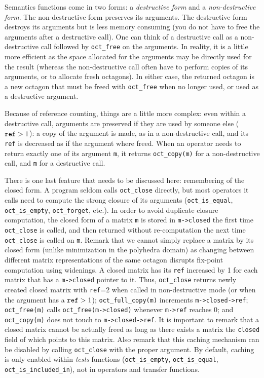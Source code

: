 \documentclass[twosides]{report}
\makeatletter
\newcommand{\findex}[1]{\index{#1@{\tt #1}}}
\makeatother
\begin{document}
Semantics functions come in two forms: a {\em destructive form\/} and a 
{\em non-destructive form}.
The non-destructive form preserves its arguments.
The destructive form destroys its arguments but is less memory consuming
(you do not have to free the arguments after a destructive call).
One can think of a destructive call as a non-destructive call followed by
{\tt oct\_free} on the arguments.
In reality, it is a little more efficient as the space allocated for the
arguments may be directly used for the result (whereas the non-destructive
call often have to perform copies of its arguments, or to allocate
fresh octagons).
In either case, the returned octagon is a new octagon that must be
freed with {\tt oct\_free} when no longer used, or used as a destructive
argument.

Because of reference counting, things are a little more complex:
even within a destructive call, arguments are preserved if they are used
by someone else (${\tt ref}>1$): a copy of the argument is made, as in
a non-destructive call, and its {\tt ref} is decreased as if the argument where
freed.
When an operator needs to return exactly one of its argument {\tt m}, 
it returns
{\tt oct\_copy(m)} for a non-destructive call, and {\tt m} for a destructive
call.

\findex{oct\_close}
\findex{oct\_close\_lazy}
There is one last feature that needs to be discussed here: remembering of the
closed form.
A program seldom calls {\tt oct\_close} directly, but most operators
it calls need to compute the strong closure of its arguments
({\tt oct\_is\_equal}, {\tt oct\_is\_empty}, {\tt oct\_forget}, etc.).
In order to avoid duplicate closure computation,
the closed form of a matrix {\tt m} is stored in {\tt m->closed}
the first time {\tt oct\_close} is called, and then returned 
without re-computation the next time {\tt oct\_close} is called on {\tt m}.
Remark that we cannot simply replace a matrix by its closed form 
(unlike minimization in the polyhedra domain) 
as changing between different matrix
representations of the same octagon disrupts fix-point computation using
widenings.
A closed matrix has its {\tt ref} increased by 1 for each matrix that has a 
{\tt m->closed} pointer to it.
Thus, {\tt oct\_close} returns newly created closed matrix with {\tt ref}=2
when called in non-destructive mode (or when the argument has a ${\tt ref}>1$);
{\tt oct\_full\_copy(m)} increments {\tt m->closed->ref};
{\tt oct\_free(m)} calls {\tt oct\_free(m->closed)} whenever
{\tt m->ref} reaches 0; and {\tt oct\_copy(m)} does not touch to
{\tt m->closed->ref}.
It is important to remark that a closed matrix cannot be actually
freed as long as there exists a matrix the {\tt closed} field of which points
to this matrix.
Also remark that this caching mechanism can be disabled by calling 
{\tt oct\_close} with the proper argument.
By default, caching is only enabled within {\it tests} functions
({\tt oct\_is\_empty}, {\tt oct\_is\_equal}, {\tt oct\_is\_included\_in}), not
in operators and transfer functions.
\end{document}
